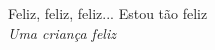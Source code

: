\pretextualchapter{}
\vfill
\begin{flushright}
	Feliz, feliz, feliz... Estou tão feliz\\
	\textit{Uma criança feliz}
\end{flushright}








